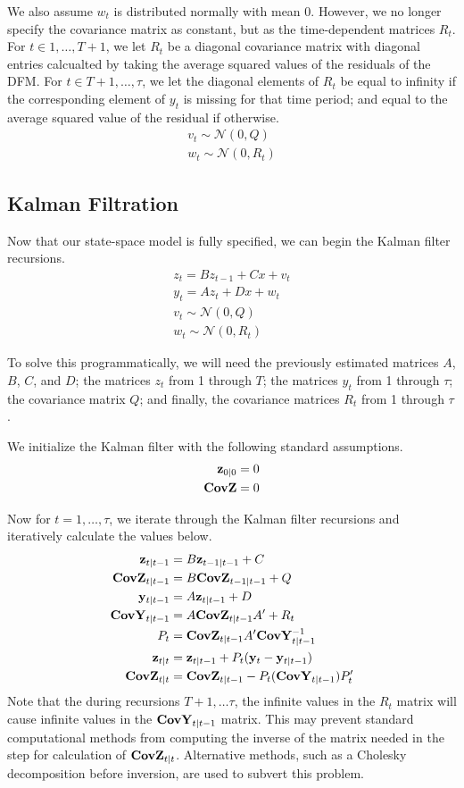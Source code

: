 \documentclass[11pt, letterpaper]{article}\usepackage[]{graphicx}\usepackage[]{color}
\newcommand{\vv}[1]{\textcolor{black}{\mathbf{#1}}}
\begin{document}
We also assume $w_t$ is distributed normally with mean $0$. However, we no longer specify the covariance matrix as constant, but as the time-dependent matrices $R_t$. For $t \in 1, \dots, T+1$, we let $R_t$ be a diagonal covariance matrix with diagonal entries calcualted by taking the average squared values of the residuals of the DFM. For $t \in T+1, \dots, \tau$, we let the diagonal elements of $R_t$ be equal to infinity if the corresponding element of $y_t$ is missing for that time period; and equal to the average squared value of the residual if otherwise.
\begin{align*}
	v_t \sim \mathcal{N}(0, Q)\\
	w_t \sim \mathcal{N}(0, R_t)
\end{align*}

\subsection{Kalman Filtration}
Now that our state-space model is fully specified, we can begin the Kalman filter recursions.
\begin{align*}
	z_t = B z_{t-1} + Cx + v_t\\
	y_t = A z_t + Dx + w_t\\
	v_t \sim \mathcal{N}(0, Q)\\
	w_t \sim \mathcal{N}(0, R_t)
\end{align*}

To solve this programmatically, we will need the previously estimated matrices $A$, $B$, $C$, and $D$; the matrices $z_t$ from 1 through $T$; the matrices $y_t$ from 1 through $\tau$; the covariance matrix $Q$; and finally, the covariance matrices $R_t$ from 1 through $\tau$.

We initialize the Kalman filter with the following standard assumptions. 
\begin{align*}
	\vv{z}_{0|0} = 0\\
	\vv{CovZ} = 0
\end{align*}

Now for $t = 1, \dots, \tau$, we iterate through the Kalman filter recursions and iteratively calculate the values below.
\begin{align*}
	\vv{z}_{t|t-1} &= B \vv{z}_{t-1|t-1} + C\\
	\vv{CovZ}_{t|t-1} &= B \vv{CovZ}_{t-1|t-1} + Q\\
	\vv{y}_{t|t-1} &= A \vv{z}_{t|t-1} + D\\
	\vv{CovY}_{t|t-1} &= A \vv{CovZ}_{t|t-1} A' + R_t\\
	P_t &= \vv{CovZ}_{t|t-1} A' \vv{CovY}^{-1}_{t|t-1}\\
	\vv{z}_{t|t} &= \vv{z}_{t|t-1} + P_t (\vv{y}_t - \vv{y}_{t|t-1})\\
	\vv{CovZ}_{t|t} &= \vv{CovZ}_{t|t-1} - P_t (\vv{CovY}_{t|t-1}) P'_t
\end{align*}
Note that the during recursions $T + 1, \dots \tau$, the infinite values in the $R_t$ matrix will cause infinite values in the $\vv{CovY}_{t|t-1}$ matrix. This may prevent standard computational methods from computing the inverse of the matrix needed in the step for calculation of $\vv{CovZ}_{t|t}$. Alternative methods, such as a Cholesky decomposition before inversion, are used to subvert this problem.
\end{document}
